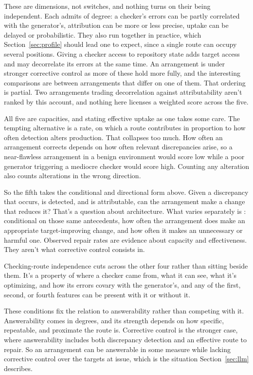 \documentclass[12pt]{article}
\begin{document}
These are dimensions, not switches, and nothing turns on their being independent. Each
admits of degree: a checker's errors can be partly correlated with the generator's,
attribution can be more or less precise, uptake can be delayed or probabilistic. They also
run together in practice, which Section~\ref{sec:profile} should lead one to expect, since
a single route can occupy several positions. Giving a checker access to repository state
adds target access and may decorrelate its errors at the same time. An arrangement is
under stronger corrective control as more of these hold more fully, and the interesting
comparisons are between arrangements that differ on one of them. That ordering is partial.
Two arrangements trading decorrelation against attributability aren't ranked by this
account, and nothing here licenses a weighted score across the five.

All five are capacities, and stating effective uptake as one takes some care. The tempting
alternative is a rate, on which a route contributes in proportion to how often detection
alters production. That collapses too much. How often an arrangement corrects depends on how
often relevant discrepancies arise, so a near-flawless arrangement in a benign environment
would score low while a poor generator triggering a mediocre checker would score high.
Counting any alteration also counts alterations in the wrong direction.

So the fifth takes the conditional and directional form above. Given a discrepancy that occurs, is
detected, and is attributable, can the arrangement make a change that reduces it? That's a
question about architecture. What varies separately is : conditional on those same antecedents, how often the arrangement does make
an appropriate target-improving change, and how often it makes an unnecessary or harmful
one. Observed repair rates are evidence about capacity and effectiveness. They aren't what
corrective control consists in.

Checking-route independence cuts across the other four rather than sitting beside them. It's
a property of where a checker came from, what it can see, what it's optimizing, and how its
errors covary with the generator's, and any of the first, second, or fourth features can be
present with it or without it.

These conditions fix the relation to answerability rather than competing with it.
Answerability comes in degrees, and its strength depends on how specific, repeatable, and
proximate the route is. Corrective control is the stronger case, where answerability
includes both discrepancy detection and an effective route to repair. So an arrangement
can be answerable in some measure while lacking corrective control over the targets at
issue, which is the situation Section~\ref{sec:llm} describes.
\end{document}
